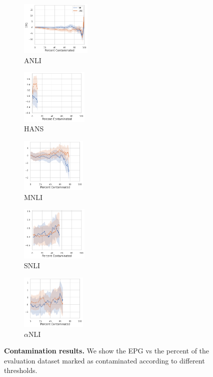 \begin{figure}[t]
    \begin{subfigure}[b]{0.20\textwidth}
    \centering
    \includegraphics[height=2.6cm]{figures/contamination_anli}
    \caption{ANLI}
    \end{subfigure}
    \label{fig:cont_anli}
    \begin{subfigure}[b]{0.19\textwidth}
    \centering
    \includegraphics[height=2.6cm]{figures/contamination_hansnli}
    \caption{HANS}
    \label{fig:cont_hans}
    \end{subfigure}
    \begin{subfigure}[b]{0.19\textwidth}
    \centering
    \includegraphics[height=2.6cm]{figures/contamination_mnli_matched}
    \caption{MNLI}
    \label{fig:cont_mnli}
    \end{subfigure}
    \begin{subfigure}[b]{0.19\textwidth}
    \centering
    \includegraphics[height=2.6cm]{figures/contamination_snli}
    \caption{SNLI}
    \label{fig:cont_snli}
    \end{subfigure}
    \begin{subfigure}[b]{0.19\textwidth}
    \centering
    \includegraphics[height=2.6cm]{figures/contamination_abductivenli}
    \caption{$\alpha$NLI}
    \label{fig:cont_alphanli}
    \end{subfigure}
    \caption{\textbf{Contamination results.} We show the EPG vs the percent of the evaluation dataset marked as contaminated according to different thresholds.}\label{fig:contamination}
\end{figure}

